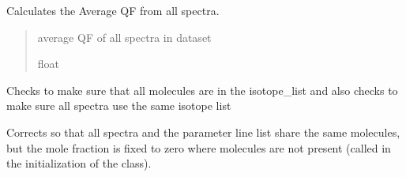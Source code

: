 \documentclass[letterpaper,10pt,english]{sphinxmanual}
\begin{document}
\begin{fulllineitems}
\begin{quote}
\begin{description}
\begin{itemize}
\end{itemize}

\end{description}\end{quote}

\begin{fulllineitems}
\label{\detokenize{MATS:MATS.dataset.Dataset.average_QF}}
\pysigstartsignatures
{}
\pysigstopsignatures
\sphinxAtStartPar
Calculates the Average QF from all spectra.
\begin{quote}\begin{description}
\sphinxAtStartPar
{} \textendash{} average QF of all spectra in dataset

\sphinxAtStartPar
float

\end{description}\end{quote}

\end{fulllineitems}


\begin{fulllineitems}
\label{\detokenize{MATS:MATS.dataset.Dataset.check_iso_list}}
\pysigstartsignatures
{}
\pysigstopsignatures
\sphinxAtStartPar
Checks to make sure that all molecules are in the isotope\_list and also checks to make sure all spectra use the same isotope list

\end{fulllineitems}


\begin{fulllineitems}
\label{\detokenize{MATS:MATS.dataset.Dataset.correct_component_list}}
\pysigstartsignatures
{}
\pysigstopsignatures
\sphinxAtStartPar
Corrects so that all spectra and the parameter line list share the same molecules, but the mole fraction is fixed to zero where molecules are not present (called in the initialization of the class).


\end{fulllineitems}
\end{fulllineitems}
\end{document}

